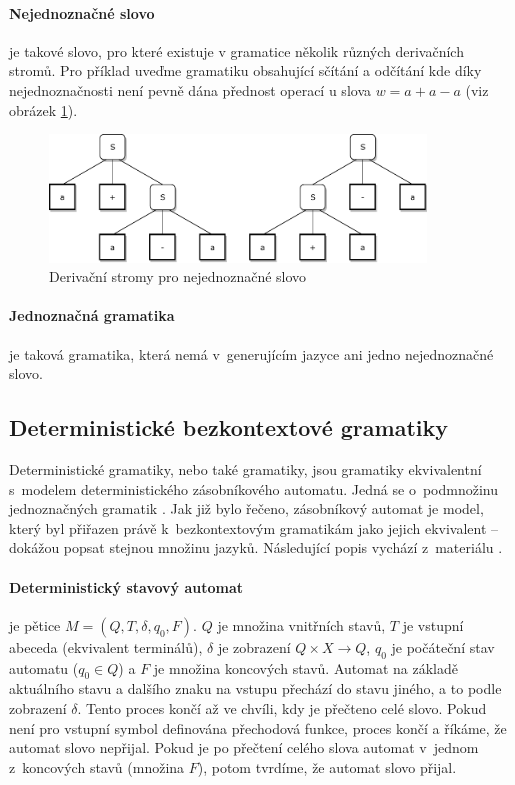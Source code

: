 			\paragraph{Nejednoznačné slovo}
			je takové slovo, pro které existuje v gramatice několik různých derivačních stromů. Pro příklad uveďme gramatiku obsahující sčítání a odčítání
			 kde díky nejednoznačnosti není pevně dána přednost operací u slova $w=a+a-a$ (viz obrázek \ref{pic:ambiguousTree}).
			\begin{figure}[h!]
				\centering
				\includegraphics[width=10cm]{img/NejednoznacnyDerivacniStrom}
				\caption{Derivační stromy pro nejednoznačné slovo}
				\label{pic:ambiguousTree}
			\end{figure}
			\paragraph{Jednoznačná gramatika}
			je taková gramatika, která nemá v~generujícím jazyce ani jedno nejednoznačné slovo.
			
		
		\subsection{Deterministické bezkontextové gramatiky}
			Deterministické gramatiky, nebo také \LRk gramatiky, jsou gramatiky ekvivalentní s~modelem deterministického zásobníkového automatu. Jedná se o~podmnožinu jednoznačných gramatik \cite{Meduna:2014:FLC:2636678}. Jak již bylo řečeno, zásobníkový automat je model, který byl přiřazen právě k~bezkontextovým gramatikám jako jejich ekvivalent -- dokážou popsat stejnou množinu jazyků. Následující popis vychází z~materiálu \cite{Meduna:2014:FLC:2636678}.
			
			\paragraph{Deterministický stavový automat}
			je pětice $M=\left(Q, T, \delta, q_0, F\right)$. $Q$ je množina vnitřních stavů, $T$ je vstupní abeceda (ekvivalent terminálů), $\delta$ je zobrazení $Q\times X\rightarrow Q$, $q_0$ je počáteční stav automatu ($q_0\in Q$) a $F$ je množina koncových stavů. Automat na základě aktuálního stavu a dalšího znaku na vstupu přechází do stavu jiného, a to podle zobrazení $\delta$. Tento proces končí až ve chvíli, kdy je přečteno celé slovo. Pokud není pro vstupní symbol definována přechodová funkce, proces končí a říkáme, že automat slovo nepřijal. Pokud je po přečtení celého slova automat v~jednom z~koncových stavů (množina $F$), potom tvrdíme, že automat slovo přijal.
